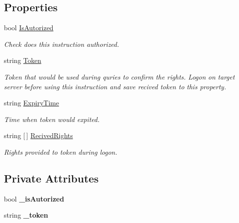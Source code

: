 \subsection*{Properties}
\begin{DoxyCompactItemize}
\item 
bool \mbox{\hyperlink{class_uniform_queries_1_1_auth_query_processor_a4b30ccde7ee894847d38961cec425e98}{Is\+Autorized}}
\begin{DoxyCompactList}\small\item\em Check does this instruction authorized. \end{DoxyCompactList}\item 
string \mbox{\hyperlink{class_uniform_queries_1_1_auth_query_processor_a6ff88b255dbd8916836a69ea086951f5}{Token}}
\begin{DoxyCompactList}\small\item\em Token that would be used during quries to confirm the rights. Logon on target server before using this instruction and save recived token to this property. \end{DoxyCompactList}\item 
string \mbox{\hyperlink{class_uniform_queries_1_1_auth_query_processor_a7fcc961b31968e6bbee1309e9cb24a9b}{Expiry\+Time}}
\begin{DoxyCompactList}\small\item\em Time when token would expited. \end{DoxyCompactList}\item 
string \mbox{[}$\,$\mbox{]} \mbox{\hyperlink{class_uniform_queries_1_1_auth_query_processor_a2efbbd31413266f084d0c7f43ad6a343}{Recived\+Rights}}
\begin{DoxyCompactList}\small\item\em Rights provided to token during logon. \end{DoxyCompactList}\end{DoxyCompactItemize}
\subsection*{Private Attributes}
\begin{DoxyCompactItemize}
\item 
\mbox{\label{class_uniform_queries_1_1_auth_query_processor_a2bac61fc85f41103aff9512d5a86d40f}} 
bool {\bfseries \+\_\+is\+Autorized}
\item 
\mbox{\label{class_uniform_queries_1_1_auth_query_processor_acd666535a455d30b59ebeb351b466d98}} 
string {\bfseries \+\_\+token}
\end{DoxyCompactItemize}
